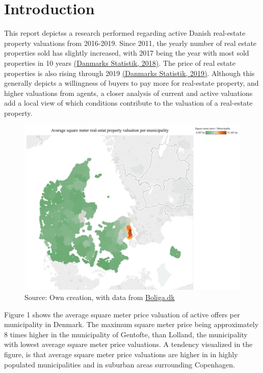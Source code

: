 \documentclass[12pt,a4paper]{article}
\begin{document}

\newpage
\onehalfspacing

\tableofcontents
\newpage
\section{Introduction}
This report depictss a research performed regarding active Danish real-estate property valuations from 2016-2019. Since 2011, the yearly number of real estate properties sold has slightly increased, with 2017 being the year with most sold properties in 10 years \href{https://www.dst.dk/da/Statistik/nyt/NytHtml?cid=27979}{(Danmarks Statistik, 2018)}.  The price of real estate properties is also rising through 2019 \href{https://www.dst.dk/da/Statistik/nyt/NytHtml?cid=28741}{(Danmarks Statistik, 2019)}. Although this generally depicts a willingness of buyers to pay more for real-estate property, and higher valuations from agents, a closer analysis of current and active valuations add a local view of which conditions contribute to the valuation of a real-estate property. \newline
\newcommand{\source}[1]{\caption*{Source: {#1}} }\begin{figure}[H]
\centering
\caption{}
\includegraphics[scale=0.4]{123.png}
\source{Own creation, with data from \href{https://www.boliga.dk}{Boliga.dk}}
\end{figure}

Figure 1 shows the average square meter price valuation of active offers per municipality in Denmark. The maximum square meter price being approximately 8 times higher in the municipality of Gentofte, than Lolland, the municipality with lowest average square meter price valuations. A tendency visualized in the figure, is that average square meter price valuations are higher in in highly populated municipalities and in suburban areas surrounding Copenhagen. \newline
\end{document}
